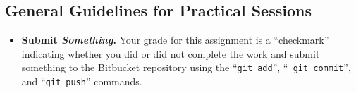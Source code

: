 \vspace*{-.15in}
\subsection*{General Guidelines for Practical Sessions}
\vspace*{-.05in}

\begin{itemize}


\item {\bf Submit \textbf{\textit{Something}}.} Your grade for this assignment is a ``checkmark'' indicating whether you
  did or did not complete the work and submit something to the Bitbucket repository using the ``{\tt git add}'', ``{\tt
    git commit}'', and ``{\tt git push}'' commands.





\end{itemize}
